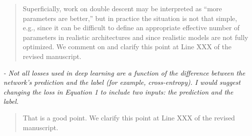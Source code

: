 \documentclass[11pt]{article}
\begin{document}
\begin{quote}
Superficially, work on double descent may be interpreted as ``more parameters are better,'' but in practice the situation is not that simple, e.g., since it can be difficult to define an appropriate effective number of parameters in realistic architectures and since realistic models are not fully optimized.
We comment on and clarify this point at Line XXX of the revised manuscript.
\end{quote}

\noindent
\emph{%
- Not all losses used in deep learning are a function of the difference between the network's prediction and the label (for example, cross-entropy). I would suggest changing the loss in Equation 1 to include two inputs: the prediction and the label.
} 

\begin{quote}
That is a good point.
We clarify this point at Line XXX of the revised manuscript.
\end{quote}



%
{\small
%

%
}
\end{document}
